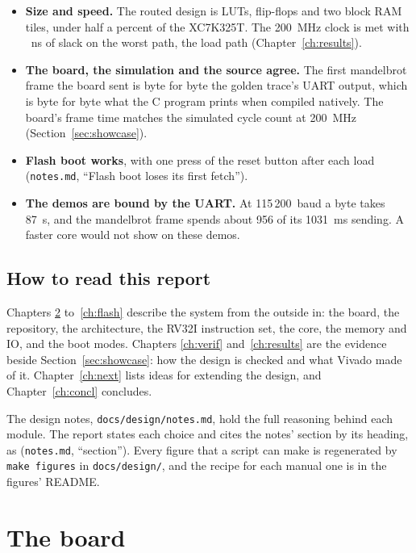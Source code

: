 \documentclass[11pt,a4paper]{report}
\newcommand{\notes}[1]{(\texttt{notes.md}, ``#1'')}
\begin{document}
\begin{itemize}[leftmargin=*, itemsep=2pt]
  \item \textbf{Size and speed.} The routed design is \implLUTs{} LUTs, \implFFs{} flip-flops
    and two block RAM tiles, under half a percent of the XC7K325T. The 200~MHz clock is met
    with \implWNS~ns of slack on the worst path, the load path (Chapter~\ref{ch:results}).
  \item \textbf{The board, the simulation and the source agree.} The first mandelbrot frame
    the board sent is byte for byte the golden trace's UART output, which is byte for byte
    what the C program prints when compiled natively. The board's frame time matches the
    simulated cycle count at 200~MHz (Section~\ref{sec:showcase}).
  \item \textbf{Flash boot works}, with one press of the reset button after each load
    \notes{Flash boot loses its first fetch}.
  \item \textbf{The demos are bound by the UART.} At 115\,200~baud a byte takes 87~\textmu s,
    and the mandelbrot frame spends about 956 of its 1031~ms sending. A faster core would not
    show on these demos.
\end{itemize}

\section{How to read this report}

Chapters \ref{ch:board-tools} to~\ref{ch:flash} describe the system from the outside in: the
board, the repository, the architecture, the RV32I instruction set, the core, the memory and
IO, and the boot modes.
Chapters \ref{ch:verif} and~\ref{ch:results} are the evidence beside
Section~\ref{sec:showcase}: how the design is checked and what Vivado made of it.
Chapter~\ref{ch:next} lists ideas for extending the design, and Chapter~\ref{ch:concl}
concludes.

The design notes, \texttt{docs/design/notes.md}, hold the full reasoning behind each module.
The report states each choice and cites the notes' section by its heading, as
\notes{section}. Every figure that a script can make is regenerated by \texttt{make figures}
in \texttt{docs/design/}, and the recipe for each manual one is in the figures' README.

\chapter{The board}
\label{ch:board-tools}
\end{document}
